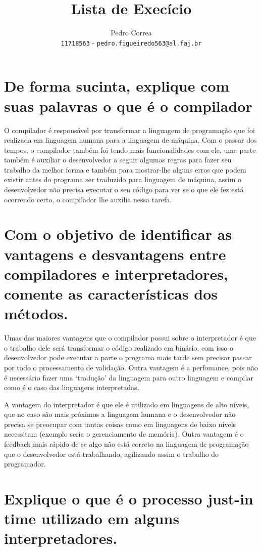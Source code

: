 \documentclass{article}
\author{
  Pedro Correa\\
  \texttt{11718563} - \texttt{pedro.figueiredo563@al.faj.br}
}
\title{Lista de Execício}
\begin{document}
\maketitle

\section{De forma sucinta, explique com suas palavras o que é o compilador}

O compilador é responsável por transformar a linguagem de programação que foi realizada em linguagem humana para a linguagem de máquina.
Com o passar dos tempos, o compilador também foi tendo mais funcionalidades com ele, uma parte também é auxiliar o desenvolvedor a seguir algumas regras para fazer seu trabalho da melhor forma e também para mostrar-lhe alguns erros que podem existir antes do programa ser traduzido para linguagem de máquina,
assim o desenvolvedor não precisa executar o seu código para ver se o que ele fez está ocorrendo certo, o compilador lhe auxilia nessa tarefa.

\section{Com o objetivo de identificar as vantagens e desvantagens entre compiladores e interpretadores, comente as características dos métodos.}

Umas das maiores vantagens que o compilador possui sobre o interpretador é que o trabalho dele será transformar o código realizado em binário,
com isso o desenvolvedor pode executar a parte o programa mais tarde sem precisar passar por todo o processamento de validação.
Outra vantagem é a perfomance, pois não é necessário fazer uma `tradução' da linguagem para outro linguagem e compilar como é o caso das linguagens interpretadas.

A vantagem do interpretador é que ele é utilizado em linguagens de alto níveis, que no caso são mais próximos a linguagem humana e o desenvolvedor não precisa se preocupar com tantas coisas como em linguagens de baixo nívels necessitam (exemplo seria o gerenciamento de memória).
Outra vantagem é o feedback mais rápido de se algo não está correto na linguagem de programação que o desenvolvedor está trabalhando,
agilizando assim o trabalho do programador.

\section{Explique o que é o processo just-in time utilizado em alguns interpretadores.}
\end{document}
